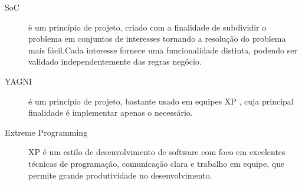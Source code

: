 \documentclass[tc,openright]{iiufrgs}
\begin{document}
\begin{description}
	\item[SoC] è um princípio de projeto, criado com a finalidade de subdividir o problema em conjuntos de interesses tornando a resolução do problema mais fácil.Cada interesse fornece uma funcionalidade distinta, podendo ser validado independentemente das regras negócio.\cite{pressman2010engineering}
	\item [YAGNI] é um princípio de projeto, bastante usado em equipes XP , cuja principal finalidade é implementar apenas o necessário.
	\item[Extreme Programming] XP é um estilo de desenvolvimento de software com foco em excelentes técnicas de programação, comunicação clara e trabalho em equipe, que permite grande produtividade no desenvolvimento. \cite{beck2004extreme}
\end{description}

\appendix
\end{document}
